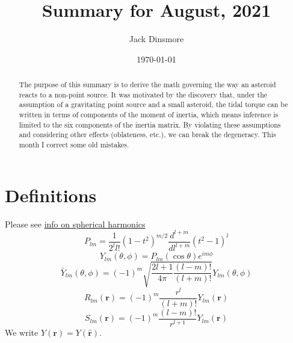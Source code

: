 \documentclass[aps,twocolumn,secnumarabic,balancelastpage,amsmath,amssymb,nofootinbib,floatfix]{revtex4-1}
\begin{document}
\title{Summary for August, 2021}
\author{Jack Dinsmore}
\date{\today}

\newcommand{\abs}[1]{\left| #1 \right|}
\newcommand{\parens}[1]{\left( #1 \right)}
\newcommand{\brackets}[1]{\left[ #1 \right]}
\newcommand{\comment}[1]{\textcolor{red}{\emph{ #1 }}}
\newcommand{\x}{\bm{\hat x}}
\newcommand{\y}{\bm{\hat y}}
\newcommand{\z}{\bm{\hat z}}
\newcommand{\J}{\mathcal{J}}
\newcommand{\K}{\mathcal{K}}
\newcommand{\R}{\mathcal{R}}





\begin{abstract}
    The purpose of this summary is to derive the math governing the way an asteroid reacts to a non-point source. It was motivated by the discovery that, under the assumption of a gravitating point source and a small asteroid, the tidal torque can be written in terms of components of the moment of inertia, which means inference is limited to the six components of the inertia matrix. By violating these assumptions and considering other effects (oblateness, etc.), we can break the degeneracy. This month I correct some old mistakes.
\end{abstract}

\maketitle



\section{Definitions}
Please see \href{https://citeseerx.ist.psu.edu/viewdoc/download?doi=10.1.1.56.5257&rep=rep1&type=pdf}{info on spherical harmonics}
$$P_{lm}=\frac{1}{2^ll!}(1-t^2)^{m/2} \frac{d^{l+m}}{dl^{l+m}}(t^2-1)^l$$
$$Y_{lm}(\theta, \phi) = P_{lm}(\cos\theta)e^{im\phi}$$
$$\bar Y_{lm}(\theta, \phi) = (-1)^m \sqrt{\frac{2l+1}{4\pi}\frac{(l-m)!}{(l+m)!}} Y_{lm}(\theta, \phi)$$
$$R_{lm}(\bm r) = (-1)^m \frac{r^l}{(l+m)!}Y_{lm}(\bm r)$$
$$S_{lm}(\bm r) = (-1)^m \frac{(l-m)!}{r^{l+1}}Y_{lm}(\bm r)$$
We write $Y(\bm r)=Y(\hat{\bm r})$.
\end{document}
